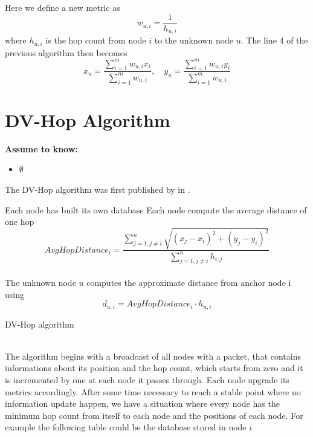 \documentclass[12pt,twoside]{report}
\begin{document}
Here we define a new metric as 
\begin{equation}
    w_{u,i}=\frac{1}{h_{u,i}}
\end{equation}
where $h_{u,i}$ is the hop count from node $i$ to the unknown node $u$. The line 4 of the previous algorithm then becomes
\begin{equation}
     x_u=\frac{\sum_{i=1}^mw_{u,i}x_i}{\sum_{i=1}^mw_{u,i}},\quad y_u=\frac{\sum_{i=1}^mw_{u,i}y_i}{\sum_{i=1}^mw_{u,i}}
\end{equation}








\clearpage

\section{DV-Hop Algorithm}
  \begin{center}
  \textbf{Assume to know:}
  \begin{itemize}
    \centering
    \item $\emptyset$
  \end{itemize}
  \end{center}
The DV-Hop algorithm was first published by in \cite{965964}.\\
\begin{algorithm}[H]
\SetAlgoLined
{}
Each node has built its own database\;
Each node compute the average distance of one hop
\begin{equation}
    AvgHopDistance_i=\frac{\sum_{j=1,j\neq i}^n\sqrt{(x_j-x_i)^2+(y_j-y_i)^2}}{\sum_{j=1,j\neq i}^nh_{i,j}}
\end{equation}\\
The unknown node $u$ computes the approximate distance from anchor node i using 
\begin{equation}
    d_{u,i}=AvgHopDistance_i \cdot h_{u,i}
    \label{eq:19}
\end{equation}
 \caption{DV-Hop algorithm}
\end{algorithm}
\noindent\\
The algorithm begins with a broadcast of all nodes with a packet, that contains informations about its position and the hop count, which starts from zero and it is incremented by one at each node it passes through. Each node upgrade its metrics accordingly. After some time necessary to reach a stable point where no information update happen, we have a situation where every node has the minimum hop count from itself to each node and the positions of each node. For example the following table could be the database stored in node $i$
\end{document}
